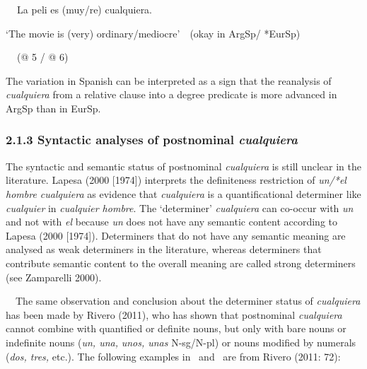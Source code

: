 \begin{styleStandard}
\textbf{\ \ }La peli es (muy/re) cualquiera. 
\end{styleStandard}

\begin{styleStandard}
‘The movie is (very) ordinary/mediocre’\ \ (okay in ArgSp/ *EurSp)
\end{styleStandard}

\begin{styleStandard}
\textbf{\ \ }(@ 5 / @ 6)
\end{styleStandard}

\begin{styleStandard}
The variation in Spanish can be interpreted as a sign that the reanalysis of \textit{cualquiera} from a relative clause into a degree predicate is more advanced in ArgSp than in EurSp. 
\end{styleStandard}

\subsubsection[2.1.3 Syntactic analyses of postnominal cualquiera]{\textbf{2.1.3 Syntactic analyses of postnominal }\textbf{\textit{cualquiera}}}
\begin{styleStandard}
The syntactic and semantic status of postnominal \textit{cualquiera} is still unclear in the literature. Lapesa (2000 [1974]) interprets the definiteness restriction of \textit{un/*el hombre cualquiera} as evidence that \textit{cualquiera} is a quantificational determiner like \textit{cualquier} in \textit{cualquier hombre}. The ‘determiner’ \textit{cualquiera} can co-occur with \textit{un} and not with \textit{el} because \textit{un} does not have any semantic content according to Lapesa (2000 [1974]). Determiners that do not have any semantic meaning are analysed as weak determiners in the literature, whereas determiners that contribute semantic content to the overall meaning are called strong determiners (see Zamparelli 2000). 
\end{styleStandard}

\begin{styleStandard}
\ \ The same observation and conclusion about the determiner status of \textit{cualquiera} has been made by Rivero (2011), who has shown that postnominal \textit{cualquiera} cannot combine with quantified or definite nouns, but only with bare nouns or indefinite nouns (\textit{un, una,} \textit{unos, unas} N-sg/N-pl) or nouns modified by numerals (\textit{dos, tres,} etc.). The following examples in \ and \ are from Rivero (2011: 72):
\end{styleStandard}


